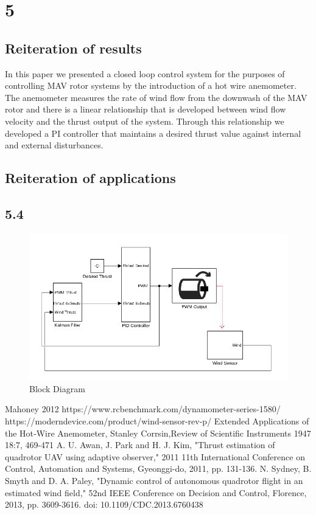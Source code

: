\documentclass[conference]{IEEEtran}
\begin{document}
	\section{5}
	\subsection{Reiteration of results}
	In this paper we presented a closed loop control system for the purposes of controlling MAV rotor systems by the introduction of a hot wire anemometer. The anemometer measures the rate of wind flow from the downwash of the MAV rotor and there is a linear relationship that is developed between wind flow velocity and the thrust output of the system. Through this relationship we developed a PI controller that maintains a desired thrust value against internal and external disturbances.
	\subsection{Reiteration of applications}
	
	\subsection{}
	\subsection{5.4}
		\begin{figure}[b]
		\includegraphics[width=\textwidth / 2]{images/block_diagram.png}
		\caption{Block Diagram}
		\label{block_diagram}
	\end{figure}
	\begin{thebibliography}{99}
		 Mahoney 2012
		 https://www.rcbenchmark.com/dynamometer-series-1580/
		 https://moderndevice.com/product/wind-sensor-rev-p/
		 Extended Applications of the Hot‐Wire Anemometer, Stanley Corrsin,Review of Scientific Instruments 1947 18:7, 469-471 
		 A. U. Awan, J. Park and H. J. Kim, "Thrust estimation of quadrotor UAV using adaptive observer," 2011 11th International Conference on Control, Automation and Systems, Gyeonggi-do, 2011, pp. 131-136.
		 N. Sydney, B. Smyth and D. A. Paley, "Dynamic control of autonomous quadrotor flight in an estimated wind field," 52nd IEEE Conference on Decision and Control, Florence, 2013, pp. 3609-3616.
		doi: 10.1109/CDC.2013.6760438
		
	\end{thebibliography}
\end{document}
